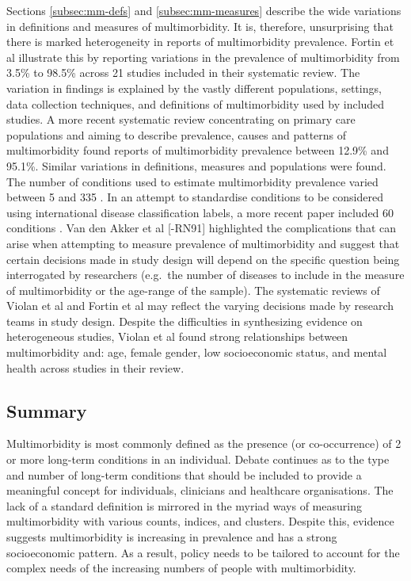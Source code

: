\documentclass[12pt,]{report}
\begin{document}
Sections \ref{subsec:mm-defs} and \ref{subsec:mm-measures} describe the
wide variations in definitions and measures of multimorbidity. It is,
therefore, unsurprising that there is marked heterogeneity in reports of
multimorbidity prevalence. Fortin et al \citeyearpar{RN56} illustrate
this by reporting variations in the prevalence of multimorbidity from
3.5\% to 98.5\% across 21 studies included in their systematic review.
The variation in findings is explained by the vastly different
populations, settings, data collection techniques, and definitions of
multimorbidity used by included studies. A more recent systematic review
concentrating on primary care populations and aiming to describe
prevalence, causes and patterns of multimorbidity \citep{RN15} found
reports of multimorbidity prevalence between 12.9\% and 95.1\%. Similar
variations in definitions, measures and populations were found. The
number of conditions used to estimate multimorbidity prevalence varied
between 5 and 335 \citep{RN15}. In an attempt to standardise conditions
to be considered using international disease classification labels, a
more recent paper included 60 conditions \citep{RN300}. Van den Akker et
al {[}-RN91{]} highlighted the complications that can arise when
attempting to measure prevalence of multimorbidity and suggest that
certain decisions made in study design will depend on the specific
question being interrogated by researchers (e.g.~the number of diseases
to include in the measure of multimorbidity or the age-range of the
sample). The systematic reviews of Violan et al \citeyearpar{RN15} and
Fortin et al \citeyearpar{RN56} may reflect the varying decisions made
by research teams in study design. Despite the difficulties in
synthesizing evidence on heterogeneous studies, Violan et al
\citeyearpar{RN15} found strong relationships between multimorbidity
and: age, female gender, low socioeconomic status, and mental health
across studies in their review.

\subsection{Summary}\label{subsec:mm-summary}

Multimorbidity is most commonly defined as the presence (or
co-occurrence) of 2 or more long-term conditions in an individual.
Debate continues as to the type and number of long-term conditions that
should be included to provide a meaningful concept for individuals,
clinicians and healthcare organisations. The lack of a standard
definition is mirrored in the myriad ways of measuring multimorbidity
with various counts, indices, and clusters. Despite this, evidence
suggests multimorbidity is increasing in prevalence and has a strong
socioeconomic pattern. As a result, policy needs to be tailored to
account for the complex needs of the increasing numbers of people with
multimorbidity.
\end{document}
